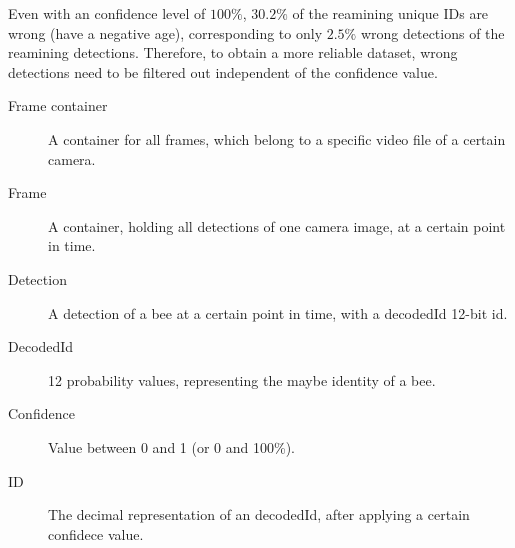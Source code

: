Even with an confidence level of $100\%$, $30.2\%$ of the reamining unique IDs are wrong (have a negative age), corresponding to only $2.5\%$ wrong detections of the reamining detections. Therefore, to obtain a more reliable dataset, wrong detections need to be filtered out independent of the confidence value.

\begin{table}[!b]
\colorbox{usethiscolorhere}{
\begin{minipage}{\dimexpr\textwidth-2\fboxsep}%
\vspace{5mm}
\begin{description}
	\item[Frame container] A container for all frames, which belong to a specific video file of a certain camera.
	\item[Frame] A container, holding all detections of one camera image, at a certain point in time.
	\item[Detection] A detection of a bee at a certain point in time, with a decodedId 12-bit id.
	\item[DecodedId] 12 probability values, representing the maybe identity of a bee.
	\item[Confidence] Value between 0 and 1 (or 0 and 100\%).
	\item[ID] The decimal representation of an decodedId, after applying a certain confidece value.
\end{description}
\vspace{5mm}
\end{minipage}}
\end{table}

